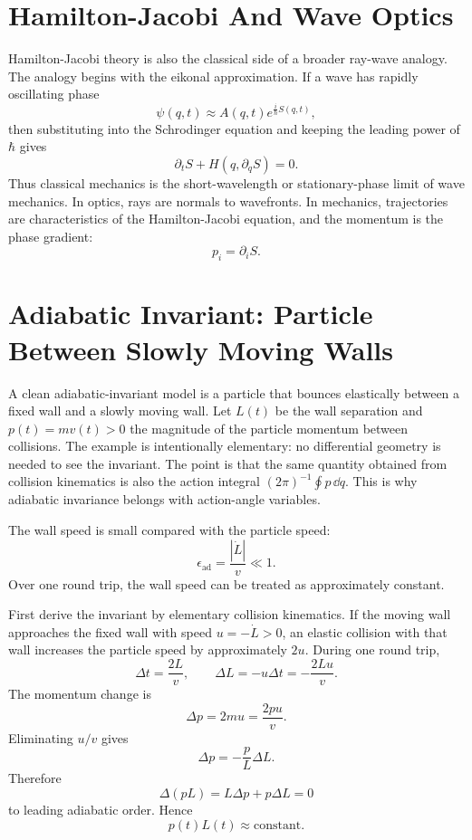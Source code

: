 \section{Hamilton-Jacobi And Wave Optics}
\label{sec:hj-wave-analogy}

Hamilton-Jacobi theory is also the classical side of a broader ray-wave
analogy. The analogy begins with the eikonal approximation. If a wave has
rapidly oscillating phase
\[
  \psi(q,t)\approx A(q,t)e^{\frac{i}{\hbar}S(q,t)},
\]
then substituting into the Schrodinger equation and keeping the leading power
of \(\hbar\) gives
\[
  \partial_tS+H\left(q,\partial_qS\right)=0.
\]
Thus classical mechanics is the short-wavelength or stationary-phase limit of
wave mechanics. In optics, rays are normals to wavefronts. In mechanics,
trajectories are characteristics of the Hamilton-Jacobi equation, and the
momentum is the phase gradient:
\[
  p_i=\partial_iS.
\]

\section{Adiabatic Invariant: Particle Between Slowly Moving Walls}
\label{sec:adiabatic-box}

A clean adiabatic-invariant model is a particle that bounces elastically
between a fixed wall and a slowly moving wall. Let \(L(t)\) be the wall
separation and \(p(t)=m v(t)>0\) the magnitude of the particle momentum between
collisions.
The example is intentionally elementary: no differential geometry is needed to
see the invariant. The point is that the same quantity obtained from collision
kinematics is also the action integral \((2\pi)^{-1}\oint p\,\dd q\). This is
why adiabatic invariance belongs with action-angle variables.

\begin{assumption}
The wall speed is small compared with the particle speed:
\[
  \epsilon_{\mathrm{ad}}
  =
  \frac{|\dot L|}{v}\ll1.
\]
Over one round trip, the wall speed can be treated as approximately constant.
\end{assumption}

First derive the invariant by elementary collision kinematics. If the moving
wall approaches the fixed wall with speed \(u=-\dot L>0\), an elastic collision
with that wall increases the particle speed by approximately \(2u\). During one
round trip,
\[
  \Delta t=\frac{2L}{v},
  \qquad
  \Delta L=-u\Delta t=-\frac{2Lu}{v}.
\]
The momentum change is
\[
  \Delta p=2mu=\frac{2pu}{v}.
\]
Eliminating \(u/v\) gives
\[
  \Delta p=-\frac{p}{L}\Delta L.
\]
Therefore
\[
  \Delta(pL)=L\Delta p+p\Delta L=0
\]
to leading adiabatic order. Hence
\[
  \boxed{p(t)L(t)\approx \text{constant}.}
\]

